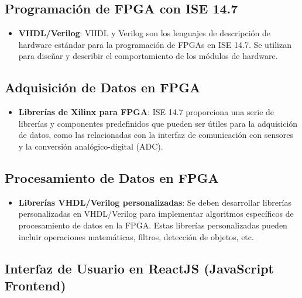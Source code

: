 \documentclass[journal]{IEEEtran}
\begin{document}
\subsection*{Programación de FPGA con ISE 14.7}

\begin{itemize}
    \item \textbf{VHDL/Verilog}: VHDL y Verilog son los lenguajes de descripción de hardware estándar para la programación de FPGAs en ISE 14.7. Se utilizan para diseñar y describir el comportamiento de los módulos de hardware.
\end{itemize}

\subsection*{Adquisición de Datos en FPGA}

\begin{itemize}
  \item \textbf{Librerías de Xilinx para FPGA}: ISE 14.7 proporciona una serie de librerías y componentes predefinidos que pueden ser útiles para la adquisición de datos, como las relacionadas con la interfaz de comunicación con sensores y la conversión analógico-digital (ADC).
\end{itemize}

\subsection*{Procesamiento de Datos en FPGA}

\begin{itemize}
  \item \textbf{Librerías VHDL/Verilog personalizadas}: Se deben desarrollar librerías personalizadas en VHDL/Verilog para implementar algoritmos específicos de procesamiento de datos en la FPGA. Estas librerías personalizadas pueden incluir operaciones matemáticas, filtros, detección de objetos, etc.
\end{itemize}

\subsection*{Interfaz de Usuario en ReactJS (JavaScript Frontend)}
\end{document}
